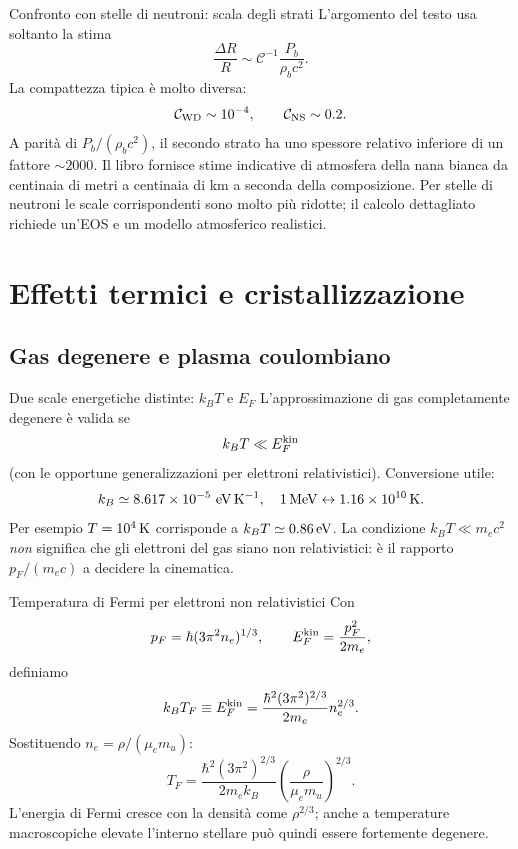 \begin{frame}[t]{Confronto con stelle di neutroni: scala degli strati}
\small
L'argomento del testo usa soltanto la stima
\[
\frac{\Delta R}{R}\sim\mathcal C^{-1}\frac{P_b}{\rho_b c^2}.
\]
La compattezza tipica è molto diversa:
\[
\mathcal C_{\rm WD}\sim10^{-4},\qquad
\mathcal C_{\rm NS}\sim0.2.
\]
A parità di $P_b/(\rho_bc^2)$, il secondo strato ha uno spessore relativo inferiore di un fattore $\sim2000$.
\medskip
Il libro fornisce stime indicative di atmosfera della nana bianca da centinaia di metri a centinaia di km a seconda della composizione. Per stelle di neutroni le scale corrispondenti sono molto più ridotte; il calcolo dettagliato richiede un'EOS e un modello atmosferico realistici.
\end{frame}

\section{Effetti termici e cristallizzazione}

\subsection{Gas degenere e plasma coulombiano}\label{ssec:degeneratecoulomb}

\begin{frame}[t]{Due scale energetiche distinte: $k_BT$ e $E_F$}
\small
L'approssimazione di gas completamente degenere è valida se
\[
k_BT\ll E_F^{\rm kin}
\]
(con le opportune generalizzazioni per elettroni relativistici).
\medskip
Conversione utile:
\[
k_B\simeq8.617\times10^{-5}\ {\rm eV\,K^{-1}},\quad
1\,{\rm MeV}\leftrightarrow1.16\times10^{10}\,{\rm K}.
\]
Per esempio $T=10^4\,{\rm K}$ corrisponde a $k_BT\simeq0.86\,{\rm eV}$.
\medskip
La condizione $k_BT\ll m_ec^2$ \emph{non} significa che gli elettroni del gas siano non relativistici: è il rapporto $p_F/(m_ec)$ a decidere la cinematica.
\end{frame}

\begin{frame}[t]{Temperatura di Fermi per elettroni non relativistici}
\small
Con
\[
p_F=\hbar(3\pi^2n_e)^{1/3},\qquad
E_F^{\rm kin}=\frac{p_F^2}{2m_e},
\]
definiamo
\[
k_BT_F\equiv E_F^{\rm kin}
=\frac{\hbar^2(3\pi^2)^{2/3}}{2m_e}n_e^{2/3}.
\]
Sostituendo $n_e=\rho/(\mu_em_u)$:
\[
T_F=\frac{\hbar^2(3\pi^2)^{2/3}}{2m_ek_B}
\left(\frac\rho{\mu_em_u}\right)^{2/3}.
\]
L'energia di Fermi cresce con la densità come $\rho^{2/3}$; anche a temperature macroscopiche elevate l'interno stellare può quindi essere fortemente degenere.
\end{frame}

